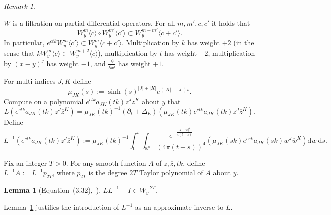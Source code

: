 \documentclass{article}
\newcommand{\di}{\mathrm{d}}
\newcommand{\real}{\mathbb{R}}
\newcommand{\inv}{^{-1}}
\newcommand{\TD}{T}
\newtheorem{lemma}[theorem]{Lemma}
\theoremstyle{definition}
\theoremstyle{remark}
\newtheorem{remark}[theorem]{Remark}
\begin{document}
\begin{remark}
    \label{rmk:weightremarks}

    $W$ is a filtration on partial differential operators.
    For all $m, m', c, c'$ it holds that
    \[
        W^m_y\langle c \rangle \circ W^{m'}_y \langle c'\rangle \subset W^{m+m'}_y \langle c+c'\rangle.
    \]
    In particular, $e^{ctk} W^m_y\langle c' \rangle \subset W^m_y\langle c+c'\rangle$.
    Multiplication by $k$ has weight $+2$ (in the sense that $k W^m_y\langle c\rangle \subset W^{m+2}_y \langle c \rangle$), multiplication by $t$ has weight $-2$, multiplication by $(x-y)^j$ has weight $-1$, and $\frac{\partial}{\partial x^i}$ has weight $+1$.
\end{remark}

For multi-indices $J, K$ define
\[
    \mu_{JK}(s) := \sinh(s)^{|J|+|K|}e^{(|K|-|J|)s}.
\]
Compute on a polynomial $e^{ctk} a_{JK}(tk) z^J \overline{z}^K$ about $y$ that
\begin{equation}
    L(e^{ctk}a_{JK}(tk) z^J \overline{z}^K) = \mu_{JK}(tk)\inv (\partial_t + \Delta_E) (\mu_{JK}(tk) e^{ctk} a_{JK}(tk) z^J \overline{z}^K).
\end{equation}
Define
\begin{equation}
    \label{eq:heatop}
    L\inv(e^{ctk} a_{JK}(tk) z^J \overline{z}^K) := \mu_{JK}(tk)\inv \int_0^t \int_{\real^8} \frac{e^{-\frac{|z-w|^2}{4(t-s)}}}{(4\pi(t-s))^4} (\mu_{JK}(sk) e^{csk}a_{JK}(sk) w^J \overline{w}^K) \di w\ \di s. 
\end{equation}

Fix an integer $\TD > 0$.
For any smooth function $A$ of $z, \overline{z}, tk$, define $L\inv A := L\inv p_{2\TD}$, where $p_{2\TD}$ is the degree $2\TD$ Taylor polynomial of $A$ about $y$.
\begin{lemma}[{Equation~(3.32),~\cite{charbonneauAsymptoticHodgeTheory2015}}]
    \label{lem:approxl}
    $LL\inv - I \in W^{-2\TD}_y$.
\end{lemma}
Lemma~\ref{lem:approxl} justifies the introduction of $L\inv$ as an approximate inverse to $L$.
\end{document}
